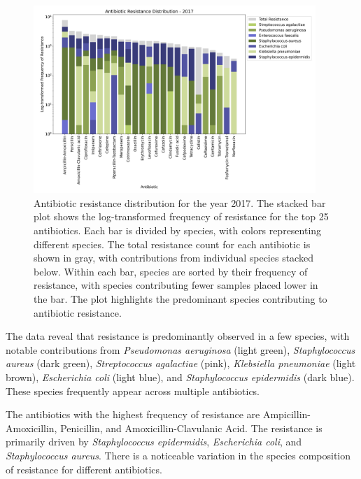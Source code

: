 \documentclass[english,11pt,a4paper,titlepage]{article}
\begin{document}
\begin{figure}[h]
	\centering
	\includegraphics[width=0.95\textwidth]{img/antibiotic_resistance_distribution_filtered_2017.png}
	\caption{Antibiotic resistance distribution for the year 2017. The stacked bar plot shows the log-transformed frequency of resistance for the top 25 antibiotics. Each bar is divided by species, with colors representing different species. The total resistance count for each antibiotic is shown in gray, with contributions from individual species stacked below. Within each bar, species are sorted by their frequency of resistance, with species contributing fewer samples placed lower in the bar. The plot highlights the predominant species contributing to antibiotic resistance.}
	\label{fig:antibiotic_resistance_distribution}
\end{figure}

The data reveal that resistance is predominantly observed in a few species, with notable contributions from \textit{Pseudomonas aeruginosa} (light green), \textit{Staphylococcus aureus} (dark green), \textit{Streptococcus agalactiae} (pink), \textit{Klebsiella pneumoniae} (light brown), \textit{Escherichia coli} (light blue), and \textit{Staphylococcus epidermidis} (dark blue). These species frequently appear across multiple antibiotics.

The antibiotics with the highest frequency of resistance are Ampicillin-Amoxicillin, Penicillin, and Amoxicillin-Clavulanic Acid. The resistance is primarily driven by \textit{Staphylococcus epidermidis}, \textit{Escherichia coli}, and \textit{Staphylococcus aureus}. There is a noticeable variation in the species composition of resistance for different antibiotics.
\end{document}
